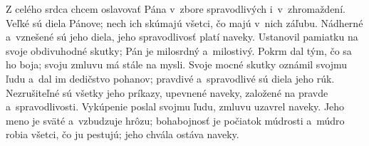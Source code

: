 Z celého srdca chcem oslavovať Pána
v~zbore spravodlivých i~v~zhromaždení.
\versseparator
Veľké sú diela Pánove;
nech ich skúmajú všetci, čo majú v~nich záľubu.
\versseparator
Nádherné a~vznešené sú jeho diela,
jeho spravodlivosť platí naveky.
\versseparator
Ustanovil pamiatku na svoje obdivuhodné skutky;
Pán je milosrdný a~milostivý.
Pokrm dal tým, čo sa ho boja;
\versseparator
svoju zmluvu má stále na mysli.
Svoje mocné skutky oznámil svojmu ľudu
\versseparator
a~dal im dedičstvo pohanov;
pravdivé a~spravodlivé sú diela jeho rúk.
\versseparator
Nezrušiteľné sú všetky jeho príkazy,
upevnené naveky,
založené na pravde a~spravodlivosti.
\versseparator
Vykúpenie poslal svojmu ľudu,
zmluvu uzavrel naveky.
\versseparator
Jeho meno je sväté a~vzbudzuje hrôzu;
bohabojnosť je počiatok múdrosti
\versseparator
a~múdro robia všetci, čo ju pestujú;
jeho chvála ostáva naveky.